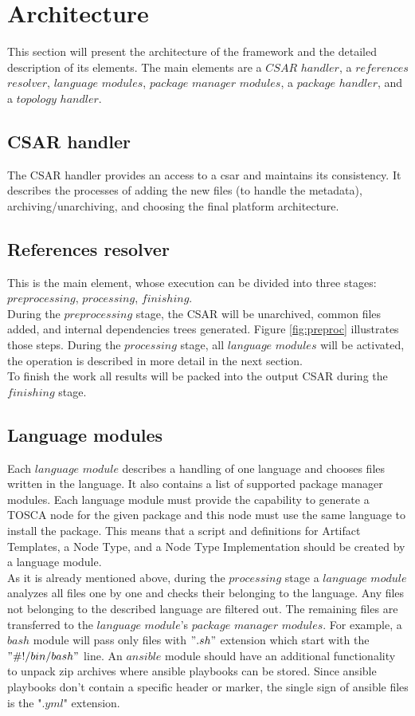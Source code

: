 \section{Architecture}\label{sec:arch}
This section will present the architecture of the framework and the detailed description of its elements.
The main elements are a $CSAR$ $handler$, a $references$ $resolver$, $language$ $modules$, $package$ $manager$ $modules$, a $package$ $handler$, and a $topology$ $handler$.

\subsection{CSAR handler} \label{subs:casr_h}
The CSAR handler provides an access to a \gls{csar} and maintains its consistency. 
It describes the processes of adding the new files (to handle the metadata), archiving/unarchiving, and choosing the final platform architecture.

\subsection{References resolver} \label{subs:RR}
This is the main element, whose execution can be divided into three stages: $preprocessing$, $processing$, $finishing$. \\
During the $preprocessing$ stage, the CSAR will be unarchived, common files added, and internal dependencies trees generated.
Figure \ref{fig:preproc} illustrates those steps.
During the $processing$ stage, all $language$ $modules$ will be activated, the operation is described in more detail in the next section. \\
To finish the work all results will be packed into the output CSAR during the $finishing$ stage.


\subsection{Language modules} \label{subs:archlm}
Each $language$ $module$ describes a handling of one language and chooses files written in the language.
It also contains a list of supported package manager modules.
Each language module must provide the capability to generate a TOSCA node for the given package and this node must use the same language to install the package.
This means that a script and definitions for Artifact Templates, a Node Type, and a Node Type Implementation should be created by a language module.\\
As it is already mentioned above, during the $processing$ stage a $language$ $module$ analyzes all files one by one and checks their belonging to the language. 
Any files not belonging to the described language are filtered out.
The remaining files are transferred to the $language$ $module$'s $package$ $manager$ $modules$.
For example, a $bash$ module will pass only files with $".sh"$ extension which start with the $"\#!/bin/bash"$ line.
An $ansible$ module should have an additional functionality to unpack zip archives where ansible playbooks can be stored.
Since ansible playbooks don't contain a specific header or marker, the single sign of ansible files is the "$.yml$" extension. 

